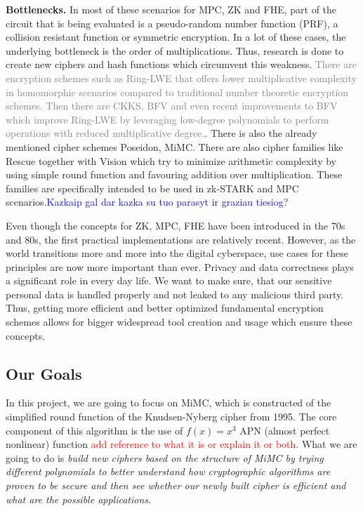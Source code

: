 \documentclass{Resources/UoBLab1}
\theoremstyle{definition}
\begin{document}
\noindent\textbf{Bottlenecks.} In most of these scenarios for MPC, ZK and FHE, part of the circuit that is being evaluated is a pseudo-random number function (PRF), a collision resistant function or symmetric encryption. In a lot of these cases, the underlying bottleneck is the order of multiplications. Thus, research is done to create new ciphers and hash functions which circumvent this weakness. \textcolor{gray}{There are encryption schemes such as Ring-LWE\cite{RINGLWE} that offers lower multiplicative complexity in homomorphic scenarios compared to traditional number theoretic encryption schemes. Then there are CKKS\cite{CKKS}, BFV\cite{BFV1}\cite{BFV2} and even recent improvements to BFV\cite{BFVImprov} which improve Ring-LWE by leveraging low-degree polynomials to perform operations with reduced multiplicative degree.}. There is also the already mentioned cipher schemes Poseidon\cite{Poseidon}, MiMC\cite{MiMC}. There are also cipher families like Rescue together with Vision\cite{Rescue} which try to minimize arithmetic complexity by using simple round function and favouring addition over multiplication. These families are specifically intended to be used in zk-STARK and MPC scenarios.\textcolor{blue}{Kazkaip gal dar kazka su tuo parasyt ir graziau tiesiog?}

Even though the concepts for ZK, MPC, FHE have been introduced in the 70s and 80s, the first practical implementations are relatively recent. However, as the world transitions more and more into the digital cyberspace, use cases for these principles are now more important than ever. Privacy and data correctness plays a significant role in every day life. We want to make sure, that our sensitive personal data is handled properly and not leaked to any malicious third party. Thus, getting more efficient and better optimized fundamental encryption schemes allows for bigger widespread tool creation and usage which ensure these concepts.

\subsection{Our Goals}
In this project, we are going to focus on MiMC, which is constructed of the simplified round function of the Knudsen-Nyberg cipher from 1995\cite{KNCipher}. The core component of this algorithm is the use of \(f(x)=x^3\) APN (almost perfect nonlinear) function \textcolor{red}{add reference to what it is or explain it or both}. What we are going to do is \textit{build new ciphers based on the structure of MiMC by trying different polynomials to better understand how cryptographic algorithms are proven to be secure and then see whether our newly built cipher is efficient and what are the possible applications.}
\end{document}
